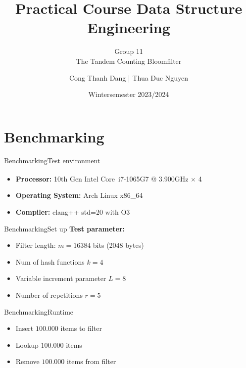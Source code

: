 \documentclass[
  english,            %
  aspectratio=169,    %
]{tumbeamer}
\title{Practical Course Data Structure Engineering}
\subtitle{Group 11 \\ The Tandem Counting Bloomfilter}
\author{Cong Thanh Dang | Thua Duc Nguyen}
\date[07/02/2024]{Wintersemester 2023/2024}
\begin{document}
\maketitle

\section{Benchmarking}

\begin{frame}{Benchmarking}{Test environment}
    \begin{itemize}
        \item \textbf{Processor:} 10th Gen Intel\textsuperscript{\textregistered} Core\texttrademark~i7-1065G7 @ 3.900GHz $\times$ 4
        \item \textbf{Operating System:} Arch Linux x86\_64
        \item \textbf{Compiler:} clang++ std=20 with O3
    \end{itemize}
\end{frame}    

\begin{frame}{Benchmarking}{Set up}
        \textbf{Test parameter:} 
            \begin{itemize}
                    \item Filter length: $m = 16384$ bits (2048 bytes)
                    \item Num of hash functions $k = 4$
                    \item Variable increment parameter $L = 8$
                    \item Number of repetitions $r = 5$
            \end{itemize}
\end{frame}


\begin{frame}{Benchmarking}{Runtime}
        \begin{itemize}
            \item Insert $100.000$ items to filter
            \item Lookup $100.000$ items
            \item Remove $100.000$ items from filter
        \end{itemize}
\end{frame}
\end{document}
